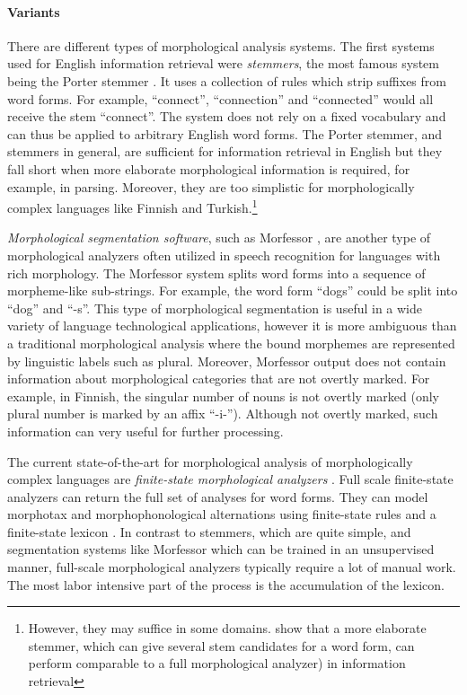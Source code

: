 \paragraph{Variants} There are different types of morphological analysis
systems. The first systems used for English information retrieval were
{\it stemmers}, the most famous system being the Porter stemmer
\citep{Porter1997}. It uses a collection of rules which strip suffixes
from word forms. For example, ``connect'', ``connection'' and
``connected'' would all receive the stem ``connect''. The system does
not rely on a fixed vocabulary and can thus be applied to arbitrary
English word forms. The Porter stemmer, and stemmers in general, are
sufficient for information retrieval in English but they fall short
when more elaborate morphological information is required, for
example, in parsing. Moreover, they are too simplistic for
morphologically complex languages like Finnish and
Turkish.\footnote{However, they may suffice in some
  domains. \cite{Kettunen2005} show that a more elaborate stemmer,
  which can give several stem candidates for a word form, can perform
  comparable to a full morphological analyzer) in information
  retrieval}

{\it Morphological segmentation software}, such as Morfessor
\citep{Creutz2002}, are another type of morphological analyzers often
utilized in speech recognition for languages with rich morphology. The
Morfessor system splits word forms into a sequence of morpheme-like
sub-strings. For example, the word form ``dogs'' could be split into
``dog'' and ``-s''.  This type of morphological segmentation is useful
in a wide variety of language technological applications, however it
is more ambiguous than a traditional morphological analysis where the
bound morphemes are represented by linguistic labels such as
plural. Moreover, Morfessor output does not contain information about
morphological categories that are not overtly marked. For example, in
Finnish, the singular number of nouns is not overtly marked (only
plural number is marked by an affix ``-i-''). Although not overtly
marked, such information can very useful for further processing.

The current state-of-the-art for morphological analysis of
morphologically complex languages are {\it finite-state morphological
  analyzers} \citep{Kaplan1994,Koskenniemi1984}. Full scale
finite-state analyzers can return the full set of analyses for word
forms. They can model morphotax and morphophonological alternations
using finite-state rules and a finite-state lexicon
\citep{Beesley2003}. In contrast to stemmers, which are quite simple,
and segmentation systems like Morfessor which can be trained in an
unsupervised manner, full-scale morphological analyzers typically
require a lot of manual work. The most labor intensive part of the
process is the accumulation of the lexicon.

